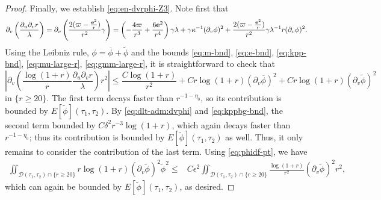 \documentclass[10pt, reqno]{amsart}
\theoremstyle{definition}
\theoremstyle{remark}
\theoremstyle{conjecture}
\numberwithin{equation}{section}
\newcommand{\set}[1]{\{#1\}}
\newcommand{\rd}{\partial}
\newcommand{\0}{\emptyset}
\newcommand{\gmm}{\gamma}
\newcommand{\dlt}{\delta}
\newcommand{\eps}{\epsilon}
\newcommand{\kpp}{\kappa}
\newcommand{\lmb}{\lambda}
\newcommand{\bfe}{{\bf e}}
\newcommand{\calD}{\mathcal D}
\newcommand{\dvr}{\lmb}
\newcommand{\e}{\bfe}							%
\newcommand{\phibg}{\overline{\phi}}				%
\newcommand{\phidf}{\widetilde{\phi}}				%
\newcommand{\Abs}[1]{\left\vert #1 \right\vert}
\begin{document}
\begin{proof}
Finally, we establish \eqref{eq:en-dvrphi-Z3}. Note first that
\begin{align*}
\rd_{v} \left(\frac{\rd_{u} \rd_{v} r}{\dvr} \right)
= \rd_{v} \left( \frac{2 (\varpi - \frac{\e^{2}}{r})}{r^{2}} \gmm \right)
= \left( - \frac{4 \varpi}{r^{3}} + \frac{6 \e^{2}}{r^{4}} \right) \gmm \dvr + \gmm \kpp^{-1} (\rd_{v} \phi)^{2} + \frac{2 (\varpi - \frac{\e^{2}}{r})}{r^{2}} \gmm \dvr^{-1} r (\rd_{v} \phi)^{2}.
\end{align*}
Using the Leibniz rule, $\phi = \phibg + \phidf$ and the bounds \eqref{eq:m-bnd}, \eqref{eq:e-bnd}, \eqref{eq:kpp-bnd}, \eqref{eq:mu-large-r}, \eqref{eq:gmm-large-r}, it is straightforward to check that
\begin{equation*}
	\Abs{\rd_{v} \left(\frac{\log (1+r)}{r} \frac{\rd_{u} \rd_{v} r}{\dvr}\right) r^{2}}
	\leq \frac{C \log(1+r)}{r^{2}} + C r \log(1+r) (\rd_{v} \phibg)^{2}  + C r \log(1+r) (\rd_{v} \phidf)^{2}
\end{equation*}
in $\set{r \geq 20}$. The first term decays faster than $r^{-1-\eta_{0}}$, so its contribution is bounded by $E[\phidf](\tau_{1}, \tau_{2})$. By \eqref{eq:dlt-adm:dvphi} and \eqref{eq:kppbg-bnd}, the second term  bounded by $C \dlt^{2} r^{-3} \log(1+r)$, which again decays faster than $r^{-1-\eta_{0}}$; thus its contribution is bounded by $E[\phidf](\tau_{1}, \tau_{2})$ as well. Thus, it only remains to consider the contribution of the last term. Using \eqref{eq:phidf-pt}, we have
\begin{align*}
	\iint_{\calD(\tau_{1}, \tau_{2}) \cap \set{r \geq 20}} r \log (1+r) (\rd_{v} \phidf)^{2} \phidf^{2} 
	\leq & C \eps^{2} \iint_{\calD(\tau_{1}, \tau_{2}) \cap \set{r \geq 20}} \frac{\log (1+r)}{r^{2}} (\rd_{v} \phidf)^{2} r^{2},
\end{align*}
which can again be bounded by $E[\phidf](\tau_{1}, \tau_{2})$, as desired. \qedhere
\end{proof}
\end{document}
